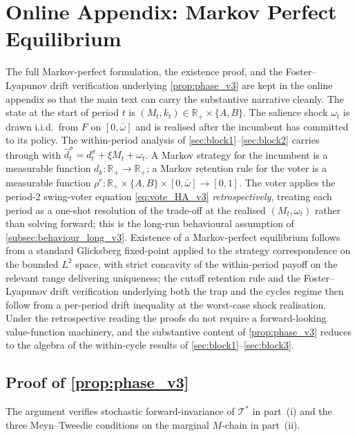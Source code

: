 \documentclass[11pt,twoside]{extarticle}
\begin{document}
\section{Online Appendix: Markov Perfect Equilibrium} \label{oa:mpe_v3}

The full Markov-perfect formulation, the existence proof, and the Foster--Lyapunov drift verification underlying \autoref{prop:phase_v3} are kept in the online appendix so that the main text can carry the substantive narrative cleanly. The state at the start of period $t$ is $(M_t,k_t)\in\mathbb R_+\times\{A,B\}$. The salience shock $\omega_t$ is drawn i.i.d.\ from $F$ on $[0,\bar\omega]$ and is realised after the incumbent has committed to its policy. The within-period analysis of \autoref{sec:block1}--\autoref{sec:block2} carries through with $\hat d_t^\sigma=d_t^\sigma+\xi M_t+\omega_t$. A Markov strategy for the incumbent is a measurable function $d_k:\mathbb R_+\to\mathbb R_+$; a Markov retention rule for the voter is a measurable function $\rho^v:\mathbb R_+\times\{A,B\}\times[0,\bar\omega]\to[0,1]$. The voter applies the period-2 swing-voter equation \autoref{eq:vote_HA_v3} \emph{retrospectively}, treating each period as a one-shot resolution of the trade-off at the realised $(M_t,\omega_t)$ rather than solving forward; this is the long-run behavioural assumption of \autoref{subsec:behaviour_long_v3}. Existence of a Markov-perfect equilibrium follows from a standard Glicksberg fixed-point applied to the strategy correspondence on the bounded $L^2$ space, with strict concavity of the within-period payoff on the relevant range delivering uniqueness; the cutoff retention rule and the Foster--Lyapunov drift verification underlying both the trap and the cycles regime then follow from a per-period drift inequality at the worst-case shock realisation. Under the retrospective reading the proofs do not require a forward-looking value-function machinery, and the substantive content of \autoref{prop:phase_v3} reduces to the algebra of the within-cycle results of \autoref{sec:block1}--\autoref{sec:block3}.

\subsection*{Proof of \autoref{prop:phase_v3}} \label{oa:proof_phase_v3}

The argument verifies stochastic forward-invariance of $\mathcal T^*$ in part~(i) and the three Meyn--Tweedie conditions on the marginal $M$-chain in part~(ii).
\end{document}
